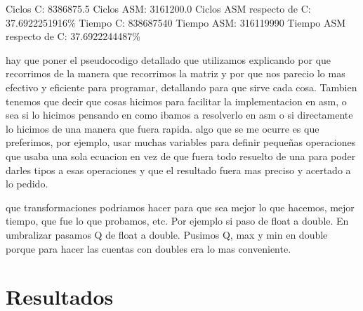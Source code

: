 \documentclass[10pt, a4paper]{article}
\begin{document}
\begin{itemize}
Ciclos C:                 8386875.5\newline
Ciclos ASM:               3161200.0\newline
Ciclos ASM respecto de C: 37.6922251916\%\newline
Tiempo C:                 838687540\newline
Tiempo ASM:               316119990\newline
Tiempo ASM respecto de C: 37.6922244487\%\newline


\end{itemize}

hay que poner el pseudocodigo detallado que utilizamos explicando por que recorrimos de la manera que recorrimos la matriz y por que nos parecio lo mas efectivo y eficiente para programar, detallando para que sirve cada cosa. Tambien tenemos que decir que cosas hicimos para facilitar la implementacion en asm, o sea si lo hicimos pensando en como ibamos a resolverlo en asm o si directamente lo hicimos de una manera que fuera rapida. algo que se me ocurre es que preferimos, por ejemplo, usar muchas variables para definir pequeñas operaciones que usaba una sola ecuacion en vez de que fuera todo resuelto de una para poder darles tipos a esas operaciones y que el resultado fuera mas preciso y acertado a lo pedido.\newline

que transformaciones podriamos hacer para que sea mejor lo que hacemos, mejor tiempo, que fue lo que probamos, etc. Por ejemplo si paso de float a double. En umbralizar pasamos Q de float a double. Pusimos Q, max y min en double porque para hacer las cuentas con doubles era lo mas conveniente.
\newline
\section{Resultados}
\end{document}
